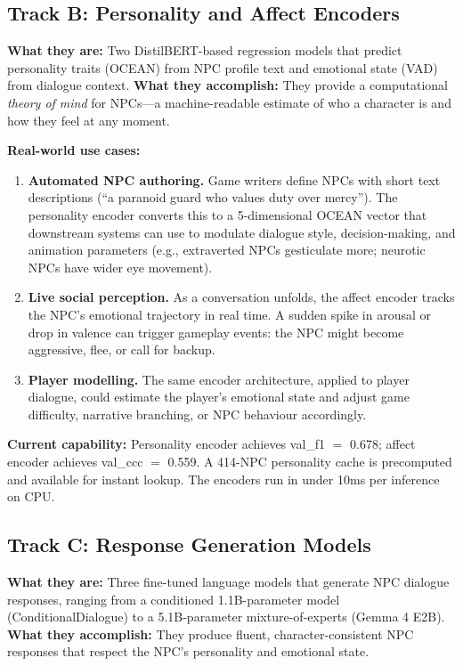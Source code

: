 \documentclass[11pt]{article}
\begin{document}
\subsection{Track B: Personality and Affect Encoders}

\textbf{What they are:} Two DistilBERT-based regression models that predict personality traits (OCEAN) from NPC profile text and emotional state (VAD) from dialogue context.
\textbf{What they accomplish:} They provide a computational \textit{theory of mind} for NPCs---a machine-readable estimate of who a character is and how they feel at any moment.

\textbf{Real-world use cases:}
\begin{enumerate}
    \item \textbf{Automated NPC authoring.} Game writers define NPCs with short text descriptions (``a paranoid guard who values duty over mercy'').
    The personality encoder converts this to a 5-dimensional OCEAN vector that downstream systems can use to modulate dialogue style, decision-making, and animation parameters (e.g., extraverted NPCs gesticulate more; neurotic NPCs have wider eye movement).
    \item \textbf{Live social perception.} As a conversation unfolds, the affect encoder tracks the NPC's emotional trajectory in real time.
    A sudden spike in arousal or drop in valence can trigger gameplay events: the NPC might become aggressive, flee, or call for backup.
    \item \textbf{Player modelling.} The same encoder architecture, applied to player dialogue, could estimate the player's emotional state and adjust game difficulty, narrative branching, or NPC behaviour accordingly.
\end{enumerate}

\textbf{Current capability:} Personality encoder achieves val\_f1 $=$ 0.678; affect encoder achieves val\_ccc $=$ 0.559.
A 414-NPC personality cache is precomputed and available for instant lookup.
The encoders run in under 10ms per inference on CPU.

\subsection{Track C: Response Generation Models}

\textbf{What they are:} Three fine-tuned language models that generate NPC dialogue responses, ranging from a conditioned 1.1B-parameter model (ConditionalDialogue) to a 5.1B-parameter mixture-of-experts (Gemma 4 E2B).
\textbf{What they accomplish:} They produce fluent, character-consistent NPC responses that respect the NPC's personality and emotional state.
\end{document}

